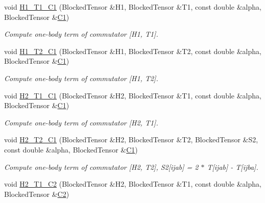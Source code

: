 \begin{DoxyCompactItemize}
void \mbox{\hyperlink{classforte_1_1_s_a_d_s_r_g_a39bdf433ea05253e35f6b2329e135e81}{H1\+\_\+\+T1\+\_\+\+C1}} (Blocked\+Tensor \&H1, Blocked\+Tensor \&T1, const double \&alpha, Blocked\+Tensor \&\mbox{\hyperlink{namespaceforte_abe00ec86d0015c0f2b6ac298c6e428e4a1a2ddc2db4693cfd16d534cde5572cc1}{C1}})
\begin{DoxyCompactList}\small\item\em Compute one-\/body term of commutator \mbox{[}H1, T1\mbox{]}. \end{DoxyCompactList}\item 
void \mbox{\hyperlink{classforte_1_1_s_a_d_s_r_g_a4edfd97c6a6a5a68c1251cc4e1611e1b}{H1\+\_\+\+T2\+\_\+\+C1}} (Blocked\+Tensor \&H1, Blocked\+Tensor \&T2, const double \&alpha, Blocked\+Tensor \&\mbox{\hyperlink{namespaceforte_abe00ec86d0015c0f2b6ac298c6e428e4a1a2ddc2db4693cfd16d534cde5572cc1}{C1}})
\begin{DoxyCompactList}\small\item\em Compute one-\/body term of commutator \mbox{[}H1, T2\mbox{]}. \end{DoxyCompactList}\item 
void \mbox{\hyperlink{classforte_1_1_s_a_d_s_r_g_ae2b3e419eb83ae278fda956afc4d481a}{H2\+\_\+\+T1\+\_\+\+C1}} (Blocked\+Tensor \&H2, Blocked\+Tensor \&T1, const double \&alpha, Blocked\+Tensor \&\mbox{\hyperlink{namespaceforte_abe00ec86d0015c0f2b6ac298c6e428e4a1a2ddc2db4693cfd16d534cde5572cc1}{C1}})
\begin{DoxyCompactList}\small\item\em Compute one-\/body term of commutator \mbox{[}H2, T1\mbox{]}. \end{DoxyCompactList}\item 
void \mbox{\hyperlink{classforte_1_1_s_a_d_s_r_g_a6c174fe0ba11650100dffa409d74386a}{H2\+\_\+\+T2\+\_\+\+C1}} (Blocked\+Tensor \&H2, Blocked\+Tensor \&T2, Blocked\+Tensor \&S2, const double \&alpha, Blocked\+Tensor \&\mbox{\hyperlink{namespaceforte_abe00ec86d0015c0f2b6ac298c6e428e4a1a2ddc2db4693cfd16d534cde5572cc1}{C1}})
\begin{DoxyCompactList}\small\item\em Compute one-\/body term of commutator \mbox{[}H2, T2\mbox{]}, S2\mbox{[}ijab\mbox{]} = 2 $\ast$ T\mbox{[}ijab\mbox{]} -\/ T\mbox{[}ijba\mbox{]}. \end{DoxyCompactList}\item 
void \mbox{\hyperlink{classforte_1_1_s_a_d_s_r_g_aaeae903134b984ce6a9598b7058338d2}{H2\+\_\+\+T1\+\_\+\+C2}} (Blocked\+Tensor \&H2, Blocked\+Tensor \&T1, const double \&alpha, Blocked\+Tensor \&\mbox{\hyperlink{namespaceforte_abe00ec86d0015c0f2b6ac298c6e428e4af1a543f5a2c5d49bc5dde298fcf716e4}{C2}})

\end{DoxyCompactItemize}
